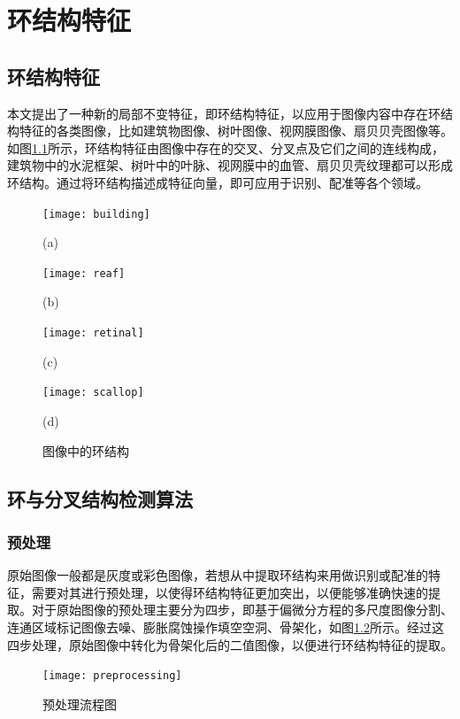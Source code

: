 

\chapter{环结构特征}
\label{cha:cycle}


\section{环结构特征}
\label{}

本文提出了一种新的局部不变特征，即环结构特征，以应用于图像内容中存在环结构特征的各类图像，比如建筑物图像、树叶图像、视网膜图像、扇贝贝壳图像等。如图\ref{fig:Example}所示，环结构特征由图像中存在的交叉、分叉点及它们之间的连线构成，建筑物中的水泥框架、树叶中的叶脉、视网膜中的血管、扇贝贝壳纹理都可以形成环结构。通过将环结构描述成特征向量，即可应用于识别、配准等各个领域。

\begin{figure}
\centering
  \begin{minipage}[b]{0.48\textwidth} 
      \centering 
      \texttt{[image: building]}
        \centerline{(a)}\medskip
    \end{minipage}
  \begin{minipage}[b]{0.48\textwidth}
    \centering
    \texttt{[image: reaf]}
      \centerline{(b)}\medskip
  \end{minipage}
  \begin{minipage}[b]{0.48\textwidth}
    \centering
    \texttt{[image: retinal]}
      \centerline{(c)}\medskip
  \end{minipage}
  \begin{minipage}[b]{0.48\textwidth}
    \centering
    \texttt{[image: scallop]}
      \centerline{(d)}\medskip
  \end{minipage}
\caption{图像中的环结构}
\label{fig:Example}
\end{figure}


\section{环与分叉结构检测算法}
\label{}

\subsection{预处理}
\label{}

原始图像一般都是灰度或彩色图像，若想从中提取环结构来用做识别或配准的特征，需要对其进行预处理，以使得环结构特征更加突出，以便能够准确快速的提取。对于原始图像的预处理主要分为四步，即基于偏微分方程的多尺度图像分割、连通区域标记图像去噪、膨胀腐蚀操作填空空洞、骨架化，如图\ref{fig:Preprocessing}所示。经过这四步处理，原始图像中转化为骨架化后的二值图像，以便进行环结构特征的提取。
\begin{figure}
\centering
    \centering
    \texttt{[image: preprocessing]}\medskip
\caption{预处理流程图}
\label{fig:Preprocessing}
\end{figure}
